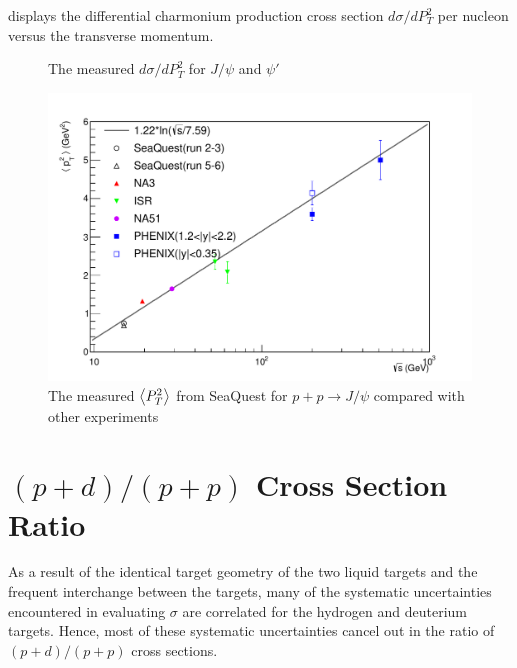 \documentclass[reprint,aps,unsortedaddress,superscriptaddress,prd,floatfix,showpacs,linenumbers]{revtex4-2}
\begin{document}
 displays the differential charmonium production cross section $d\sigma/d P_T^2$
per nucleon versus the transverse momentum.
\begin{figure}[h]
	\caption{The measured $d\sigma/d P_T^2$ for $J/\psi$ and $\psi'$}
	\label{fig:pT_cross_sections}
\end{figure}

\begin{figure}
	\centering
	\includegraphics[width=\linewidth]{crossSections/pT/pT_s_release}
	\caption{The measured $\expval{P_T^2}$ from SeaQuest for $p+p\rightarrow J/\psi$ compared with other experiments \cite{clark1978,drapier1998,acharya2020}}
	\label{fig:pt_s}
\end{figure}

\section{$(p+d)/(p+p)$ Cross Section Ratio}
\label{sec:CSR}
As a result of the identical target geometry
of the two liquid targets and the frequent interchange between the targets,
many of the systematic uncertainties encountered in evaluating $\sigma$
are correlated for the hydrogen and deuterium targets. Hence, most of these
systematic uncertainties cancel out in the ratio of $(p+d)/(p+p)$ cross
sections.
\end{document}
